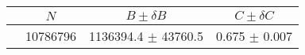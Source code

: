\begin{tabular}{lccc}
\hline
    &   $N$   & $B \pm \delta B$  &  $C \pm \delta C$ \\
\hline
                               & 10786796   & 1136394.4  $\pm$ 43760.5 & 0.675      $\pm$ 0.007 \\
\hline
\end{tabular}
